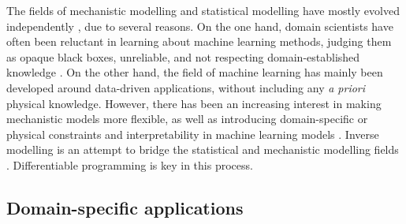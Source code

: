 The fields of mechanistic modelling and statistical modelling have mostly evolved independently \cite{zdeborova_understanding_2020}, due to several reasons. 
On the one hand, domain scientists have often been reluctant in learning about machine learning methods, judging them as opaque black boxes, unreliable, and not respecting domain-established knowledge \cite{Coveney:2016eb}. 
On the other hand, the field of machine learning has mainly been developed around data-driven applications, without including any \textit{a priori} physical knowledge. 
However, there has been an increasing interest in making mechanistic models more flexible, as well as introducing domain-specific or physical constraints and interpretability in machine learning models \cite{Molnar.2020sisk,Rudin.2022,Schneider2017,rasp2018,Yazdani2020,Abarbanel2018,Carrassi2018,Bocquet2019,Gabor2015,Gharamti2017,Curtsdotter2019,Rosenbaum2019,Toms2020,Brajard2021}.
Inverse modelling is an attempt to bridge the statistical and mechanistic modelling fields \cite{Wigner.1960, Rude:2018jv}. 
Differentiable programming is key in this process.



\subsection{Domain-specific applications}

